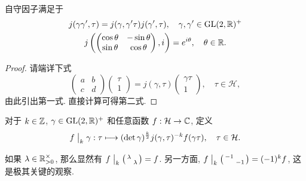 \begin{lemma}\label{prop:automorphy-cocycle}
	自守因子满足于
	\begin{gather*}
		j(\gamma\gamma', \tau) = j(\gamma, \gamma'\tau) j(\gamma', \tau), \quad \gamma,\gamma' \in \operatorname{GL}(2,\mathbb{R})^+  \\
		j\left( \begin{pmatrix} \cos\theta & -\sin\theta \\ \sin\theta & \cos\theta \end{pmatrix} , i \right) = e^{i\theta}, \quad \theta \in \mathbb{R}.
	\end{gather*}
\end{lemma}
\begin{proof}
	请端详下式
	\[ \begin{pmatrix} a & b \\ c & d \end{pmatrix} \begin{pmatrix} \tau \\ 1 \end{pmatrix} = j(\gamma, \tau) \begin{pmatrix} \gamma\tau \\ 1 \end{pmatrix}, \quad \tau \in \mathcal{H}, \]
	由此引出第一式. 直接计算可得第二式.
\end{proof}

\begin{definition}\label{def:bar-action} 
	对于 $k \in \mathbb{Z}$, $\gamma \in \operatorname{GL}(2,\mathbb{R})^+$ 和任意函数 $f: \mathcal{H} \to \mathbb{C}$, 定义
	\[ f\;\big|_{k} \; \gamma: \tau \longmapsto (\det\gamma)^{\frac{k}{2}} j(\gamma, \tau)^{-k} f(\gamma\tau), \quad \tau \in \mathcal{H}. \]
\end{definition}

如果 $\lambda \in \mathbb{R}^\times_{>0}$, 那么显然有 $f \;\big|_{k} \; \bigl(\begin{smallmatrix} \lambda &  \\  & \lambda \end{smallmatrix}\bigr) = f$. 另一方面, $f \;\big|_{k} \; \bigl(\begin{smallmatrix} -1 &  \\  & -1 \end{smallmatrix}\bigr) = (-1)^k f$, 这是极其关键的观察.

